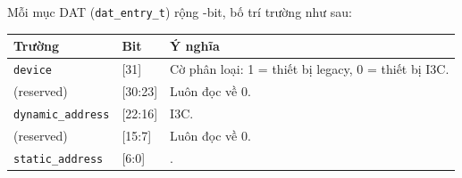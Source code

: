 Mỗi mục DAT (\texttt{dat\_entry\_t}) rộng \DatEntryWidth{}-bit, bố trí trường như sau:

\begin{longtable}{C{3.8cm} C{2.4cm} L{6.6cm}}
	\toprule
	\textbf{Trường}           & \textbf{Bit} & \textbf{Ý nghĩa}                                            \\
	\midrule
	\endhead
	\texttt{device}           & [31]         & Cờ phân loại: 1 = thiết bị \iic{} legacy, 0 = thiết bị I3C. \\
	(reserved)                & [30:23]      & Luôn đọc về 0.                                              \\
	\texttt{dynamic\_address} & [22:16]      & \DynamicAddress{} I3C.                                      \\
	(reserved)                & [15:7]       & Luôn đọc về 0.                                              \\
	\texttt{static\_address}  & [6:0]        & \StaticAddress{} \iic{}.                                    \\
	\bottomrule
\end{longtable}
